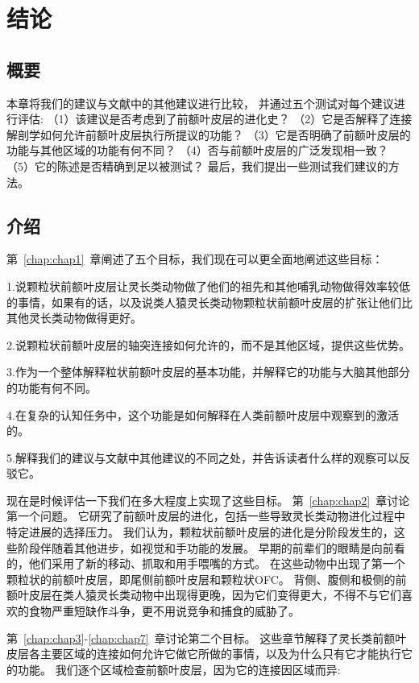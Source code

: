 \chapter{结论} \label{chap:chap10}

\section{概要}
本章将我们的建议与文献中的其他建议进行比较，
并通过五个测试对每个建议进行评估:
（1）该建议是否考虑到了前额叶皮层的进化史？
（2）它是否解释了连接解剖学如何允许前额叶皮层执行所提议的功能？
（3）它是否明确了前额叶皮层的功能与其他区域的功能有何不同？
（4）否与前额叶皮层的广泛发现相一致？
（5）它的陈述是否精确到足以被测试？
最后，我们提出一些测试我们建议的方法。

\section{介绍}
第~\ref{chap:chap1}~章阐述了五个目标，我们现在可以更全面地阐述这些目标：
\par
1.说颗粒状前额叶皮层让灵长类动物做了他们的祖先和其他哺乳动物做得效率较低的事情，如果有的话，以及说类人猿灵长类动物颗粒状前额叶皮层的扩张让他们比其他灵长类动物做得更好。
\par
2.说颗粒状前额叶皮层的轴突连接如何允许的，而不是其他区域，提供这些优势。
\par
3.作为一个整体解释粒状前额叶皮层的基本功能，并解释它的功能与大脑其他部分的功能有何不同。
\par 
4.在复杂的认知任务中，这个功能是如何解释在人类前额叶皮层中观察到的激活的。
\par 
5.解释我们的建议与文献中其他建议的不同之处，并告诉读者什么样的观察可以反驳它。
\par 
现在是时候评估一下我们在多大程度上实现了这些目标。
第~\ref{chap:chap2}~章讨论第一个问题。
它研究了前额叶皮层的进化，包括一些导致灵长类动物进化过程中特定进展的选择压力。
我们认为，颗粒状前额叶皮层的进化是分阶段发生的，这些阶段伴随着其他进步，如视觉和手功能的发展。
早期的前辈们的眼睛是向前看的，他们采用了新的移动、抓取和用手喂嘴的方式。
在这些动物中出现了第一个颗粒状的前额叶皮层，即尾侧前额叶皮层和颗粒状OFC。
背侧、腹侧和极侧的前额叶皮层在类人猿灵长类动物中出现得更晚，因为它们变得更大，不得不与它们喜欢的食物严重短缺作斗争，更不用说竞争和捕食的威胁了。
\par 
第~\ref{chap:chap3}-\ref{chap:chap7}~章讨论第二个目标。
这些章节解释了灵长类前额叶皮层各主要区域的连接如何允许它做它所做的事情，以及为什么只有它才能执行它的功能。
我们逐个区域检查前额叶皮层，因为它的连接因区域而异:
